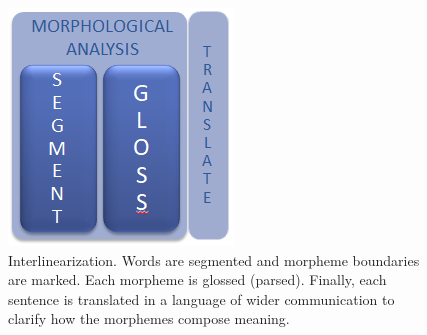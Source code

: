 \documentclass[12pt]{article}
\begin{document}
\begin{figure}[ht]
\label{fig:IGT}
\begin{center}
\includegraphics[width=0.3\columnwidth]{IGT.PNG}
\caption{Interlinearization. Words are segmented and morpheme boundaries are marked. Each morpheme is glossed (parsed). Finally, each sentence is translated in a language of wider communication to clarify how the morphemes compose meaning.}
\end{center}
\end{figure}
 
\end{document}
